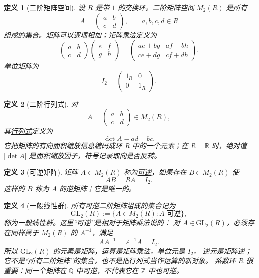 \documentclass[UTF8,fontset=none,a4paper,11pt]{ctexart}
\theoremstyle{foundation-definition}
\newtheorem{definition}{定义}[section]
\theoremstyle{foundation-theorem}
\theoremstyle{foundation-proposition}
\theoremstyle{foundation-example}
\theoremstyle{foundation-remark}
\theoremstyle{foundation-theorem}
\newcommand{\term}[2]{\hyperref[#1]{#2}}
\begin{document}
\begin{definition}[二阶矩阵空间]\label{def:matrix-space}
设 \(R\) 是带 \(1\) 的交换环。二阶矩阵空间 \(M_2(R)\) 是所有
\[
A=\begin{pmatrix}a&b\\c&d\end{pmatrix},\qquad a,b,c,d\in R
\]
组成的集合。矩阵可以逐项相加；矩阵乘法定义为
\[
\begin{pmatrix}a&b\\c&d\end{pmatrix}
\begin{pmatrix}e&f\\g&h\end{pmatrix}
=
\begin{pmatrix}ae+bg&af+bh\\ce+dg&cf+dh\end{pmatrix}.
\]
单位矩阵为
\[
I_2=\begin{pmatrix}1_R&0\\0&1_R\end{pmatrix}.
\]
\end{definition}

\begin{definition}[二阶行列式]\label{def:determinant}
对
\[
A=\begin{pmatrix}a&b\\c&d\end{pmatrix}\in M_2(R),
\]
其\term{def:determinant}{行列式}定义为
\[
\det A=ad-bc.
\]
它把矩阵的有向面积缩放信息编码成环 \(R\) 中的一个元素；在 \(R=\mathbb R\) 时，绝对值 \(|\det A|\) 是面积缩放因子，符号记录取向是否反转。
\end{definition}

\begin{definition}[可逆矩阵]\label{def:invertible-matrix}
矩阵 \(A\in M_2(R)\) 称为\term{def:invertible-matrix}{可逆}，如果存在 \(B\in M_2(R)\) 使
\[
AB=BA=I_2.
\]
这样的 \(B\) 称为 \(A\) 的逆矩阵；它是唯一的。
\end{definition}

\begin{definition}[一般线性群]\label{def:general-linear-group}
所有可逆二阶矩阵组成的集合记为
\[
\mathrm{GL}_2(R):=\{A\in M_2(R):A\text{ 可逆}\},
\]
称为\term{def:general-linear-group}{一般线性群}。这里“可逆”是相对于矩阵乘法说的：
对 \(A\in\mathrm{GL}_2(R)\)，必须存在同样属于 \(M_2(R)\) 的 \(A^{-1}\)，满足
\[
AA^{-1}=A^{-1}A=I_2.
\]
所以 \(\mathrm{GL}_2(R)\) 的元素是矩阵，运算是矩阵乘法，单位元是 \(I_2\)，
逆元是矩阵逆；它不是“所有二阶矩阵”的集合，也不是把行列式当作运算的新对象。
系数环 \(R\) 很重要：同一个矩阵在 \(\mathbb Q\) 中可逆，不代表它在 \(\mathbb Z\) 中也可逆。
\end{definition}
\end{document}
